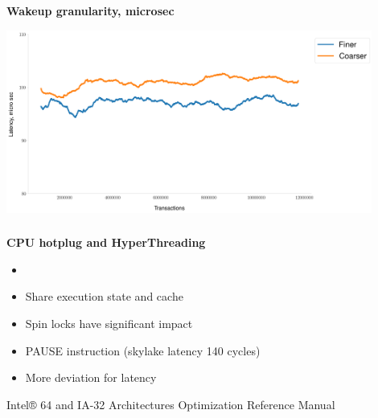 \documentclass[usenames,dvipsnames, 18pt, compress, aspectratio=169]{beamer}
\begin{document}
\begin{frame}
    \frametitle{}
    \begin{center}
    \textbf{Wakeup granularity, microsec}

        \vspace{0.5cm}
        \includegraphics[width=0.9\textwidth,center]{wakeup_granularity_2.png}

    \end{center}
\end{frame}

\begin{frame}
    \frametitle{}
    \begin{center}
    \textbf{CPU hotplug and HyperThreading}

        \begin{itemize}
            \item <+->
        \end{itemize}

        \begin{itemize}[label={\MVRightarrow}]
            \item <+-> Share execution state and cache
            \item <+-> Spin locks have significant impact
            \item <+-> PAUSE instruction (skylake latency 140 cycles)
            \item <+-> More deviation for latency
        \end{itemize}

        \normalsize{Intel® 64 and IA-32 Architectures Optimization Reference Manual}
    \end{center}
\end{frame}
\end{document}
